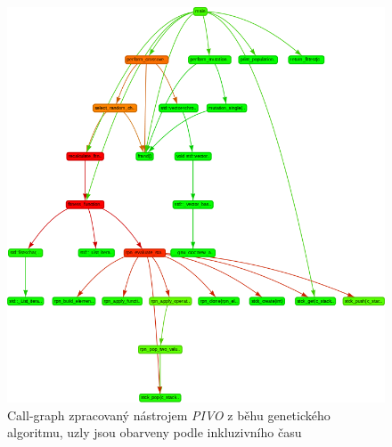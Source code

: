 \documentclass[czech,BP]{thesiskiv}
\begin{document}
\begin{figure}[h]
    \centering
    \includegraphics[interpolate,width=1.0\textwidth]{img/test-ga-pivo-graph.png}
    \caption{Call-graph zpracovaný nástrojem \emph{PIVO} z běhu genetického algoritmu, uzly jsou obarveny podle inkluzivního času}
    \label{obr:testgprofpivograph1}
\end{figure}
\end{document}
